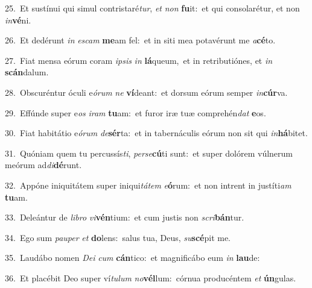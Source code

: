 {\numbfont\textcolor{\numbcolor}{25.}}~Et sustínui qui simul contristaré\-\textit{tur}\-, \textit{et} \textit{non} \textbf{fu}\-it:~\star et qui consolarétur, et non \textit{in}\-\textbf{vé}ni.\par
{\numbfont\textcolor{\numbcolor}{26.}}~Et dedérunt \textit{in} \textit{es}\-\textit{cam} \textbf{me}\-am fel:~\star et in siti mea potavérunt me \textit{a}\-\textbf{cé}to.\par
{\numbfont\textcolor{\numbcolor}{27.}}~Fiat mensa eórum coram \textit{ip}\-\textit{sis} \textit{in} \textbf{lá}\-queum,~\star et in retributiónes, et \textit{in} \textbf{scán}\-dalum.\par
{\numbfont\textcolor{\numbcolor}{28.}}~Obscuréntur óculi e\-\textit{ó}\-\textit{rum} \textit{ne} \textbf{ví}\-deant:~\star et dorsum eórum semper \textit{in}\-\textbf{cúr}va.\par
{\numbfont\textcolor{\numbcolor}{29.}}~Effúnde super e\textit{os} \textit{i}\-\textit{ram} \textbf{tu}\-am:~\star et furor iræ tuæ comprehén\textit{dat} \textbf{e}\-os.\par
{\numbfont\textcolor{\numbcolor}{30.}}~Fiat habitátio e\-\textit{ó}\-\textit{rum} \textit{de}\-\textbf{sér}ta:~\star et in tabernáculis eórum non sit qui \textit{in}\-\textbf{há}bitet.\par
{\numbfont\textcolor{\numbcolor}{31.}}~Quóniam quem tu percussís\-\textit{ti}\-, \textit{per}\-\textit{se}\textbf{cú}ti sunt:~\star et super dolórem vúlnerum meórum ad\-\textit{di}\-\textbf{dé}runt.\par
{\numbfont\textcolor{\numbcolor}{32.}}~Appóne iniquitátem super iniqui\-\textit{tá}\-\textit{tem} \textit{e}\-\textbf{ó}rum:~\star et non intrent in justíti\textit{am} \textbf{tu}\-am.\par
{\numbfont\textcolor{\numbcolor}{33.}}~Deleántur de \textit{li}\-\textit{bro} \textit{vi}\-\textbf{vén}tium:~\star et cum justis non \textit{scri}\-\textbf{bán}tur.\par
{\numbfont\textcolor{\numbcolor}{34.}}~Ego sum \textit{pau}\-\textit{per} \textit{et} \textbf{do}\-lens:~\star salus tua, Deus, \textit{su}\-\textbf{scé}pit me.\par
{\numbfont\textcolor{\numbcolor}{35.}}~Laudábo nomen \textit{De}\-\textit{i} \textit{cum} \textbf{cán}\-tico:~\star et magnificábo eum \textit{in} \textbf{lau}\-de:\par
{\numbfont\textcolor{\numbcolor}{36.}}~Et placébit Deo super ví\-\textit{tu}\-\textit{lum} \textit{no}\-\textbf{vél}lum:~\star córnua producéntem \textit{et} \textbf{ún}\-gulas.\par
